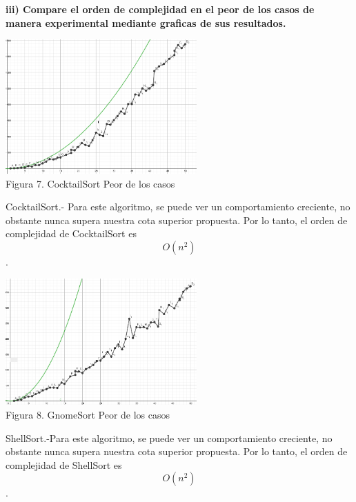 \documentclass[spanish]{article}
\begin{document}
\newpage
	{\large{\bf iii) Compare el orden de complejidad en el peor de los casos de manera experimental mediante graficas de sus resultados.}}\\
	
	\bigskip

		\begin{center}
			\includegraphics[width=0.55\textwidth]{./imagenes/cocktailPC.png}\\
			Figura 7. CocktailSort Peor de los casos\\
		\end{center}
CocktailSort.- Para este algoritmo, se puede ver un comportamiento creciente, no obstante nunca supera nuestra cota superior propuesta. Por lo tanto, el orden de complejidad de CocktailSort es $$O(n^2)$$.

		\begin{center}
			\includegraphics[width=0.55\textwidth]{./imagenes/gnomePC.png}\\
			Figura 8. GnomeSort Peor de los casos\\
		\end{center}
 ShellSort.-Para este algoritmo, se puede ver un comportamiento creciente, no obstante nunca supera nuestra cota superior propuesta. Por lo tanto, el orden de complejidad de ShellSort es $$O(n^2)$$.
\end{document}
